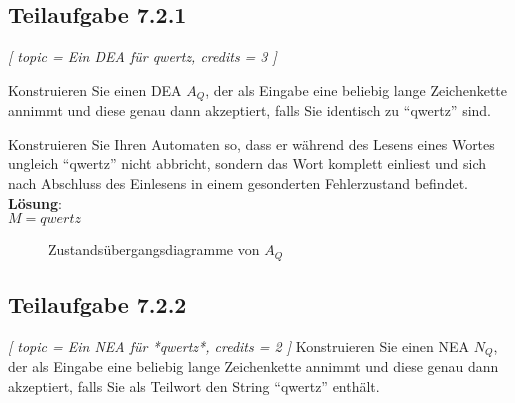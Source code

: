 \documentclass[12pt]{article}
\begin{document}
  
  
 \subsection*{Teilaufgabe 7.2.1} 
\textit{ [
 topic = Ein DEA für qwertz, 
 credits = 3 
 ] }
  
 Konstruieren Sie einen DEA $A_Q$, der als Eingabe eine beliebig lange Zeichenkette annimmt und diese genau dann akzeptiert, falls Sie identisch zu "`qwertz"' sind. 
  
 Konstruieren Sie Ihren Automaten so, dass er während des Lesens eines Wortes ungleich "`qwertz"' nicht abbricht, sondern das Wort komplett einliest und sich nach Abschluss des Einlesens in einem gesonderten Fehlerzustand befindet. \\
 \textbf{Lösung}:\\
 $M = qwertz$
  \begin{figure}[h] 
 \centering 
  
 \caption{Zustandsübergangsdiagramme von $A_{Q}$} 
 \label{A234} 
 \end{figure} 
 
  
  
 \subsection*{Teilaufgabe 7.2.2} 
\textit{[ 
 topic = Ein NEA für *qwertz*, 
 credits = 2 
 ] 
  }
 Konstruieren Sie einen NEA $N_Q$, der als Eingabe eine beliebig lange Zeichenkette annimmt und diese genau dann akzeptiert, falls Sie als Teilwort den String "`qwertz"' enthält. 
  
\end{document}
